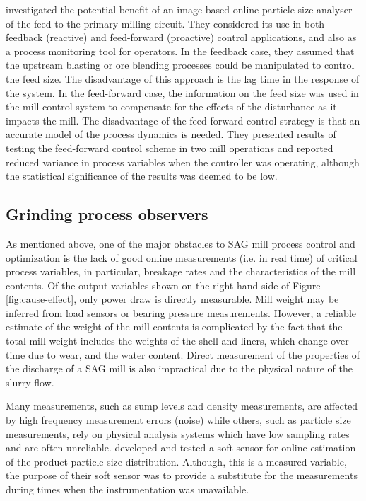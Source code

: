 \cite{steyn_investigating_2018} investigated the potential benefit of an image-based online particle size analyser of the feed to the primary milling circuit. They considered its use in both feedback (reactive) and feed-forward (proactive) control applications, and also as a process monitoring tool for operators. In the feedback case, they assumed that the upstream blasting or ore blending processes could be manipulated to control the feed size. The disadvantage of this approach is the lag time in the response of the system. In the feed-forward case, the information on the feed size was used in the mill control system to compensate for the effects of the disturbance as it impacts the mill. The disadvantage of the feed-forward control strategy is that an accurate model of the process dynamics is needed. They presented results of testing the feed-forward control scheme in two mill operations and reported reduced variance in process variables when the controller was operating, although the statistical significance of the results was deemed to be low.

\subsection{Grinding process observers}

As mentioned above, one of the major obstacles to \gls{SAG} mill process control and optimization is the lack of good online measurements (i.e. in real time) of critical process variables, in particular, breakage rates and the characteristics of the mill contents. Of the output variables shown on the right-hand side of Figure \ref{fig:cause-effect}, only power draw is directly measurable. Mill weight may be inferred from load sensors or bearing pressure measurements. However, a reliable estimate of the weight of the mill contents is complicated by the fact that the total mill weight includes the weights of the shell and liners, which change over time due to wear, and the water content. Direct measurement of the properties of the discharge of a \gls{SAG} mill is also impractical due to the physical nature of the slurry flow.

Many measurements, such as sump levels and density measurements, are affected by high frequency measurement errors (noise) while others, such as particle size measurements, rely on physical analysis systems which have low sampling rates and are often unreliable. \cite{casali_particle_1998} developed and tested a soft-sensor for online estimation of the product particle size distribution. Although, this is a measured variable, the purpose of their soft sensor was to provide a substitute for the measurements during times when the instrumentation was unavailable.

